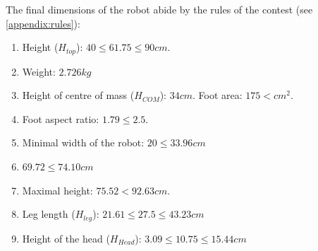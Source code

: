 The final dimensions of the robot abide by the rules of the contest (see \cref{appendix:rules}):
\begin{enumerate}
\item Height ($H_{top}$):  $40 \leq 61.75 \leq 90cm$.
\item Weight: $2.726kg$
\item Height of centre of mass ($H_{COM}$): $34cm$. Foot area: $175 < cm^2$.
\item Foot aspect ratio: $1.79 \leq 2.5$.
\item Minimal width of the robot: $20 \leq 33.96cm$
\item $69.72 \leq 74.10cm$
\item Maximal height: $75.52 < 92.63cm$.
\item Leg length ($H_{leg}$): $21.61 \leq 27.5 \leq 43.23cm$
\item Height of the head ($H_{Head}$): $3.09 \leq 10.75 \leq 15.44cm$
\end{enumerate}